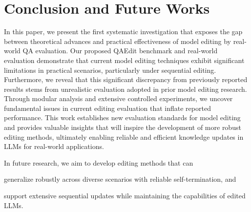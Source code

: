 \section{Conclusion and Future Works}



In this paper, we present the first systematic investigation that exposes the gap between theoretical advances and practical effectiveness of model editing by real-world QA evaluation.
Our proposed QAEdit benchmark and real-world evaluation demonstrate that current model editing techniques exhibit significant limitations in practical scenarios, particularly under sequential editing. 
Furthermore, we reveal that this significant discrepancy from previously reported results stems from unrealistic evaluation adopted in prior model editing research.
Through modular analysis and extensive controlled experiments, we uncover fundamental issues in current editing evaluation that inflate reported performance. 
This work establishes new evaluation standards for model editing and provides valuable insights that will inspire the development of more robust editing methods, ultimately enabling reliable and efficient knowledge updates in LLMs for real-world applications.

In future research, we aim to develop editing methods that can
\begin{enumerate*}[label=\roman*)] 
    \item generalize robustly across diverse scenarios with reliable self-termination, and
    \item support extensive sequential updates while maintaining the capabilities of edited LLMs.
\end{enumerate*}



